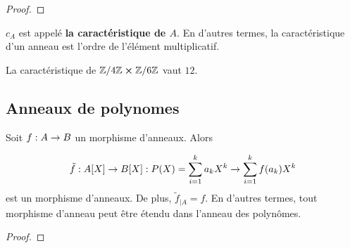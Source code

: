 \ifdefined\outputproof
\begin{proof}

\end{proof}
\fi

\begin{definition}
	$c_{A}$ est appelé \textbf{la caractéristique de $A$}. En d'autres termes, la
  caractéristique d'un anneau est l'ordre de l'élément multiplicatif.
\end{definition}

\begin{exemple}
	La caractéristique de $\mathbb{Z}/4\mathbb{Z} \cross \mathbb{Z}/6\mathbb{Z}$ vaut
	$12$.
\end{exemple}

\subsection{Anneaux de polynomes}

\begin{proposition}
	Soit $f : A \rightarrow B$ un morphisme d'anneaux. Alors

	\begin{equation}
		\tilde{f} : A[X] \rightarrow B[X] : P(X) = \sum_{i = 1}^{k} a_{k} X^{k}
	\rightarrow \sum_{i = 1}^{k} f(a_{k}) X^{k}
	\end{equation}
	est un morphisme d'anneaux. De plus, $\tilde{f}_{|A} = f$. En d'autres termes,
  tout morphisme d'anneau peut être étendu dans l'anneau des polynômes.
\end{proposition}

\ifdefined\outputproof
\begin{proof}

\end{proof}
\fi

